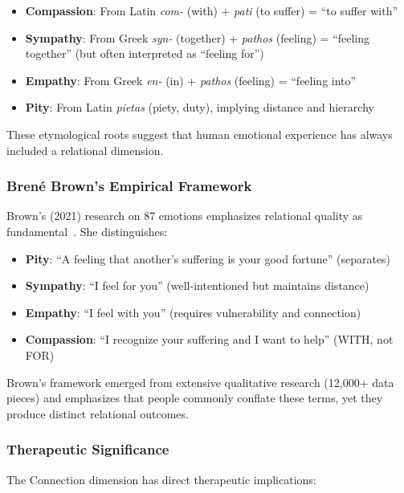 \documentclass[10pt,twocolumn]{article}
\begin{document}
\begin{itemize}
    \item \textbf{Compassion}: From Latin \textit{com-} (with) + \textit{pati} (to suffer) = ``to suffer with''
    \item \textbf{Sympathy}: From Greek \textit{syn-} (together) + \textit{pathos} (feeling) = ``feeling together'' (but often interpreted as ``feeling for'')
    \item \textbf{Empathy}: From Greek \textit{en-} (in) + \textit{pathos} (feeling) = ``feeling into''
    \item \textbf{Pity}: From Latin \textit{pietas} (piety, duty), implying distance and hierarchy
\end{itemize}

These etymological roots suggest that human emotional experience has always included a relational dimension.

\subsubsection{Brené Brown's Empirical Framework}

Brown's (2021) research on 87 emotions emphasizes relational quality as fundamental~\cite{brown2021}. She distinguishes:

\begin{itemize}
    \item \textbf{Pity}: ``A feeling that another's suffering is your good fortune'' (separates)
    \item \textbf{Sympathy}: ``I feel for you'' (well-intentioned but maintains distance)
    \item \textbf{Empathy}: ``I feel with you'' (requires vulnerability and connection)
    \item \textbf{Compassion}: ``I recognize your suffering and I want to help'' (WITH, not FOR)
\end{itemize}

Brown's framework emerged from extensive qualitative research (12,000+ data pieces) and emphasizes that people commonly conflate these terms, yet they produce distinct relational outcomes.

\subsubsection{Therapeutic Significance}

The Connection dimension has direct therapeutic implications:
\end{document}

